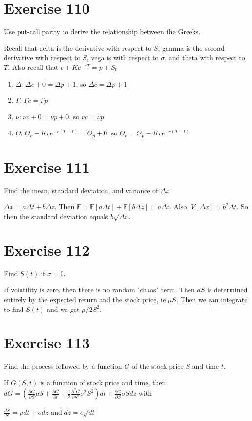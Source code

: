\documentclass{article}
\begin{document}
\section*{Exercise 110}
Use put-call parity to derive the relationship between the Greeks.
\begin{flushleft}
    Recall that delta is the derivative with respect to $S$, gamma is the second derivative with respect to $S$, vega is with respect to $\sigma$, and theta with respect to $T$. Also recall that $c + Ke^{-rT} = p + S_0$
    \begin{enumerate}
        \item $\Delta$: $\Delta c + 0 = \Delta p + 1$, so $\Delta c = \Delta p + 1$
        \item $\Gamma$: $\Gamma c = \Gamma p$
        \item $\nu$: $\nu c + 0 = \nu p + 0$, so $\nu c = \nu p$
        \item $\Theta$: $\Theta_c - Kre^{-r(T-t)} = \Theta_p + 0$, so $\Theta_c = \Theta_p - Kre^{-r(T-t)}$
    \end{enumerate}
\end{flushleft}

\section*{Exercise 111}
Find the mean, standard deviation, and variance of $\Delta x$
\begin{flushleft}
    $\Delta x = a\Delta t + b\Delta z$. Then $\mathbb{E} = \mathbb{E}[a\Delta t] + \mathbb{E}[b\Delta z] = a\Delta t$.
    Also, $V[\Delta x] = b^2\Delta t$. So then the standard deviation equals $b\sqrt{\Delta t}$.
\end{flushleft}

\section*{Exercise 112}
Find $S(t)$ if $\sigma = 0$.
\begin{flushleft}
    If volatility is zero, then there is no random "chaos" term. Then $dS$ is determined entirely by the expected return and the stock price, ie $\mu S$. Then we can integrate to find $S(t)$ and we get $\mu/2 S^2$.
\end{flushleft}

\section*{Exercise 113}
Find the process followed by a function $G$ of the stock price $S$ and time $t$.
\begin{flushleft}
    If $G(S,t)$ is a function of stock price and time, then $dG = (\frac{\partial G}{\partial S}\mu S + \frac{\partial G}{\partial t} + \frac{1}{2}\frac{\partial^2G}{\partial S^2}\sigma^2S^2)dt + \frac{\partial G}{\partial S}\sigma S dz$ with
    \begin{center}
        $\frac{dS}{S} = \mu dt + \sigma dz$ and $dz = \epsilon \sqrt{dt}$
    \end{center}
\end{flushleft}
\end{document}
